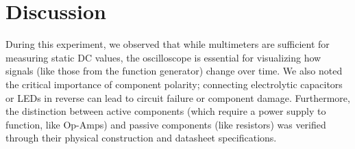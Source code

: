 \section{Discussion}

During this experiment, we observed that while multimeters are sufficient for measuring static DC values, the oscilloscope is essential for visualizing how signals (like those from the function generator) change over time. We also noted the critical importance of component polarity; connecting electrolytic capacitors or LEDs in reverse can lead to circuit failure or component damage. Furthermore, the distinction between active components (which require a power supply to function, like Op-Amps) and passive components (like resistors) was verified through their physical construction and datasheet specifications.
